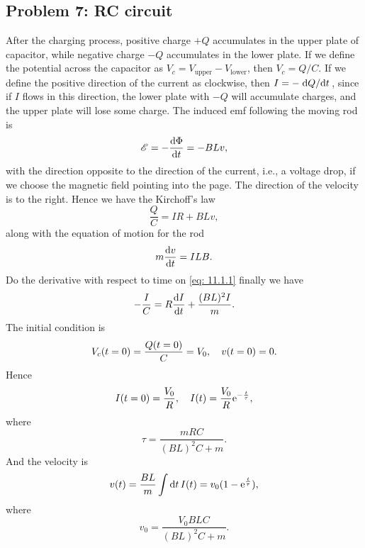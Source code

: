 \documentclass[10pt]{article}
\begin{document}
\subsection{Problem 7: RC circuit}
After the charging process, positive charge $+Q$ accumulates in the upper plate of capacitor, while negative charge $-Q$ accumulates in the lower plate. If we define the potential across the capacitor as $V_c = V_{\text{upper}} - V_{\text{lower}}$, then $V_c = Q/C$. If we define the positive direction of the current as clockwise, then $I = -\dv*{Q}{t}$, since if  $I$ flows in this direction, the lower plate with $-Q$ will accumulate charges, and the upper plate will lose some charge. The induced emf following the moving rod is 
\begin{equation}
	\mathscr{E} = - \dv{\Phi}{t} = - BLv, 
\end{equation}
with the direction opposite to the direction of the current, i.e., a voltage drop, if we choose the magnetic field pointing into the page. The direction of the velocity is to the right. Hence we have the Kirchoff's law 
\begin{equation}
	\frac{Q}{C} = IR + BLv, \label{eq: 11.1.1}
\end{equation}
along with the equation of motion for the rod 
\begin{equation}
	m \dv{v}{t} = ILB.
\end{equation}
Do the derivative with respect to time on \eqref{eq: 11.1.1} finally we have 
\begin{equation}
	-\frac{I}{C} = R \dv{I}{t} + \frac{(BL)^2I}{m}.
\end{equation}
The initial condition is 
\begin{equation}
	V_c(t=0) = \frac{Q(t=0)}{C} = V_0\qc v(t=0) = 0.
\end{equation}
Hence 
\begin{equation}
	I(t=0) = \frac{V_0}{R}\qc I(t) = \frac{V_0}{R} \e^{-\frac{t}{\tau}},
\end{equation}
where 
\begin{equation}
	\tau = \frac{mRC}{(BL)^2C + m}.
\end{equation}
And the velocity is 
\begin{equation}
	v(t) = \frac{BL}{m}\int \dd{t} I(t) = v_0 (1-{\mathrm{e}}^{\frac{t}{\tau}}),
\end{equation}
where 
\begin{equation}
	v_0 = \frac{V_0 BLC}{(BL)^2 C + m}.
\end{equation}
\end{document}
